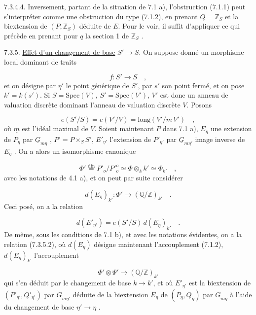 7.3.4.4. Inversement, partant de la situation de 7.1 a), l'obstruction (7.1.1) peut s'interpréter comme une obstruction du type (7.1.2), en prenant $Q = \mathbb{Z}_S$ et la biextension de $(P,\mathbb{Z}_S)$ déduite de $E$. Pour le voir, il suffit d'appliquer ce qui précède en prenant pour $q$ la section 1 de $\mathbb{Z}_S$ .

7.3.5. \underline{Effet d'un changement de base} $S' \longrightarrow S$. On suppose donné un morphisme local dominant de traits

\begin{equation*}
f : S' \longrightarrow S \quad ,
\end{equation*}
et on désigne par $\eta'$ le point générique de $S'$, par $s'$ son point fermé, et on pose $k'=k(s')$. Si $S=\mathrm{Spec}(V)$, $S' = \mathrm{Spec}(V')$, $V'$ est donc un anneau de valuation discrète dominant l'anneau de valuation discrète $V$. Posons

\begin{equation}\tag{7.3.5.1}
e(S'/S) = e(V'/V) = \mathrm{long}(V'/\underline{m}\,V') \quad ,
\end{equation}
où $\underline{m}$ est l'idéal maximal de $V$. Soient maintenant $P$ dans 7.1 a), $E_\eta$ une extension de $P_\eta$ par $\underline{G}_{m\eta}$ , $P' = P\times_S S'$, $E'_{\eta'}$ l'extension de $P'_{\eta'}$ par $\underline{G}_{m\eta'}$ image inverse de $E_\eta$ . On a alors un isomorphisme canonique 



\begin{equation*}
 \Phi' \overset{\mathrm{dfn}}{=} P'_o/{P'}^{o}_{o} \simeq \Phi \otimes_k k' \simeq \Phi_{k'} \quad ,
\end{equation*}
avec les notations de 4.1 a), et on peut par suite considérer

\begin{equation*}
d(E_\eta)_{k'} : \Phi' \longrightarrow (\mathbb{Q}/\mathbb{Z})_{k'} \quad .
\end{equation*}
Ceci posé, on a la relation

\begin{equation}\tag{7.3.5.2}
d(E'_{\eta'}) = e(S'/S)\, d(E_\eta)_{k'} \quad .
\end{equation}
De même, sous les conditions de 7.1 b), et avec les notations évidentes, on a la relation (7.3.5.2), où $d(E_\eta)$ désigne maintenant l'accouplement (7.1.2), $d(E_\eta)_{k'}$ l'accouplement

\begin{equation*}
\Phi' \otimes \Psi' \longrightarrow (\mathbb{Q}/\mathbb{Z})_{k'}
\end{equation*}
qui s'en déduit par le changement de base $k \longrightarrow k'$, et où $E'_{\eta'}$ est la biextension de $(P'_{\eta'}, Q'_{\eta'})$ par $\underline{G}_{m\eta'}$ déduite de la biextension $E_\eta$ de $(P_\eta,Q_\eta)$ par $\underline{G}_{m\eta}$ à l'aide du changement de base $\eta' \longrightarrow \eta$ .

